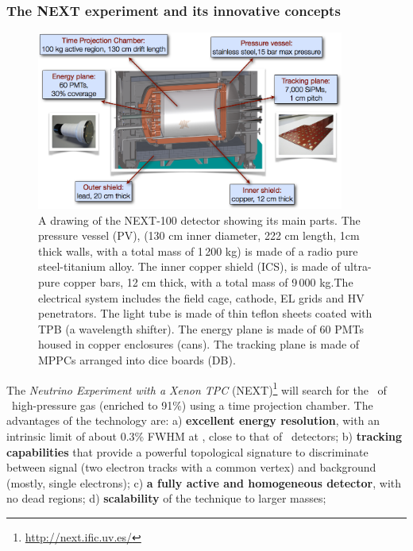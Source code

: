 \documentclass[a4paper,11pt,oneside]{article}
\begin{document}
\subsubsection*{The NEXT experiment and its innovative concepts}
\begin{figure}
\centering
\includegraphics[width=0.9\textwidth]{img/NEXT.png}
\caption{\small A drawing of the NEXT-100 detector showing its main parts.  The pressure vessel (PV),  (130 cm inner diameter, 222 cm length, 1cm thick walls, with a total mass of 1\,200 kg) is made of a radio pure steel-titanium alloy.
The inner copper shield (ICS), is made of ultra-pure copper bars, 12 cm thick, with a total mass of 9\,000 kg.The electrical system includes the field cage, cathode, EL grids and HV penetrators.
The light tube is made of thin teflon sheets coated with TPB (a wavelength shifter). 
The energy plane is made of 60 PMTs housed in copper enclosures (cans).
The tracking plane is made of MPPCs arranged into dice boards (DB). 
}
\label{fig.NEXT100}
\end{figure}

The \emph{Neutrino Experiment with a Xenon TPC} (NEXT)\footnote{\href{http://next.ific.uv.es/}{http://next.ific.uv.es/}} will search for the \bbonu\ of \XE\ high-pressure gas (enriched to 91\%) using a time projection chamber. The advantages of the technology are: 
a) {\bf excellent energy resolution}, with an intrinsic limit of about 0.3\% FWHM at \Qbb, close to that of \GE\ detectors; b)
{\bf tracking capabilities} that provide a powerful topological signature to discriminate between signal (two electron tracks with a common vertex) and background (mostly, single electrons); c)
{\bf a fully active and homogeneous detector}, with no dead regions; d) {\bf scalability} of the technique to larger masses; %
\end{document}
